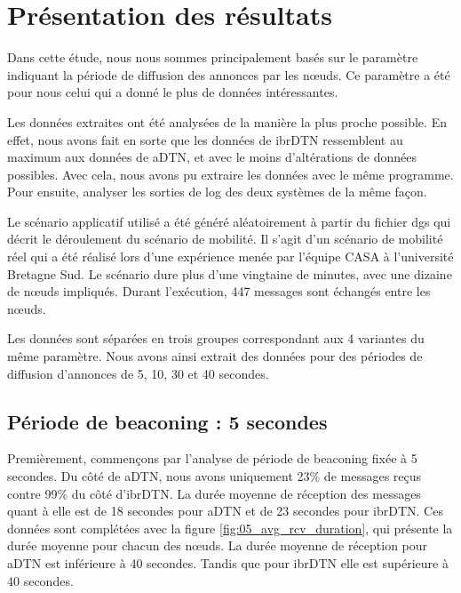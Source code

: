 \documentclass[a4paper,10pt]{article}
\begin{document}
\section {Présentation des résultats}
Dans cette étude, nous nous sommes principalement basés sur le paramètre indiquant la période de diffusion des annonces par les nœuds. Ce paramètre a été pour nous celui qui a donné le plus de données intéressantes. \par

Les données extraites ont été analysées de la manière la plus proche possible. En effet, nous avons fait en sorte que les données de ibrDTN ressemblent au maximum aux données de aDTN, et avec le moins d’altérations de données possibles. Avec cela, nous avons pu extraire les données avec le même programme. Pour ensuite, analyser les sorties de log des deux systèmes de la même façon.\par

Le scénario applicatif utilisé a été généré aléatoirement à partir du fichier dgs qui décrit le déroulement du scénario de mobilité. Il s’agit d’un scénario de mobilité réel qui a été réalisé lors d'une expérience menée par l'équipe CASA à l’université Bretagne Sud. Le scénario dure plus d’une vingtaine de minutes, avec une dizaine de nœuds impliqués. Durant l'exécution, 447 messages sont échangés entre les nœuds. \par

Les données sont séparées en trois groupes correspondant aux 4 variantes du même paramètre. Nous avons ainsi extrait des données pour des périodes de diffusion d'annonces de 5, 10, 30 et 40 secondes.


\subsection {Période de beaconing : 5 secondes}

Premièrement, commençons par l’analyse de période de beaconing fixée à 5 secondes. Du côté de aDTN, nous avons uniquement 23\% de messages reçus contre 99\% du côté d’ibrDTN. La durée moyenne de réception des messages quant à elle est de 18 secondes pour aDTN et de 23 secondes pour ibrDTN. Ces données sont complétées avec la figure \ref{fig:05_avg_rcv_duration}, qui présente la durée moyenne pour chacun des nœuds. La durée moyenne de réception pour aDTN est inférieure à 40 secondes. Tandis que pour ibrDTN elle est supérieure à 40 secondes.\par
\end{document}
